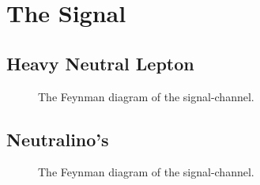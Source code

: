 \section{The Signal}\label{sec:signal}
\subsection{Heavy Neutral Lepton}
\begin{figure}
    \centering
    \caption{The Feynman diagram of the signal-channel.}
\end{figure}
\subsection{Neutralino's}
\begin{figure}
    \centering
    \caption{The Feynman diagram of the signal-channel.}
\end{figure}